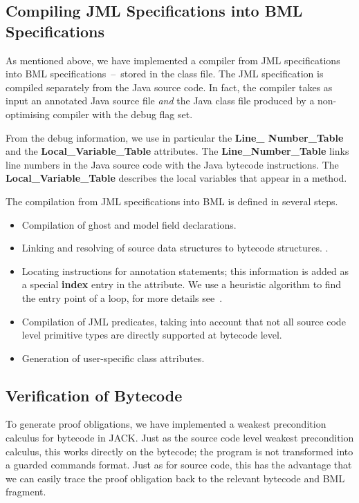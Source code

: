 \subsection{Compiling JML Specifications into BML Specifications}

As mentioned above, we have implemented a compiler from JML
specifications into BML specifications~--~stored in the class file. 
The JML specification is compiled separately from the Java source
code. In fact, the compiler takes as input an annotated Java source file
\emph{and} the Java class file produced by a non-optimising compiler
with the debug flag set. 

From the debug information, we use in particular the
\textbf{Line\_ Number\_Table} and the \textbf{Local\_Variable\_Table}
attributes. The \textbf{Line\_Number\_Table} links line numbers in the
Java source code with the Java bytecode instructions.  The
\textbf{Local\_Variable\_Table} describes the local variables that
appear in a method.  

The compilation from JML specifications into BML is defined in several
steps. 

\begin{itemize}

\item Compilation of ghost and model field declarations.


\item Linking and resolving of source data structures to bytecode structures. .

\item Locating instructions for annotation statements; this
information is added as a special \textbf{index} entry in the
attribute. We use a heuristic algorithm to find the entry point of a
loop, for more details see~\cite{Pavlova:phd}.

 
\item Compilation of JML predicates, taking into account that not all
source code level primitive types are directly supported at bytecode
level. 

\item Generation of user-specific class attributes.
    
\end{itemize}


\subsection{Verification of Bytecode}
To generate proof obligations, we have implemented a weakest
precondition calculus for bytecode in JACK. Just as the source code
level weakest precondition calculus, this works directly on the
bytecode; the program is not transformed into a guarded commands
format. Just as for source code, this has the advantage that we can
easily trace the proof obligation back to the relevant bytecode and
BML fragment.

